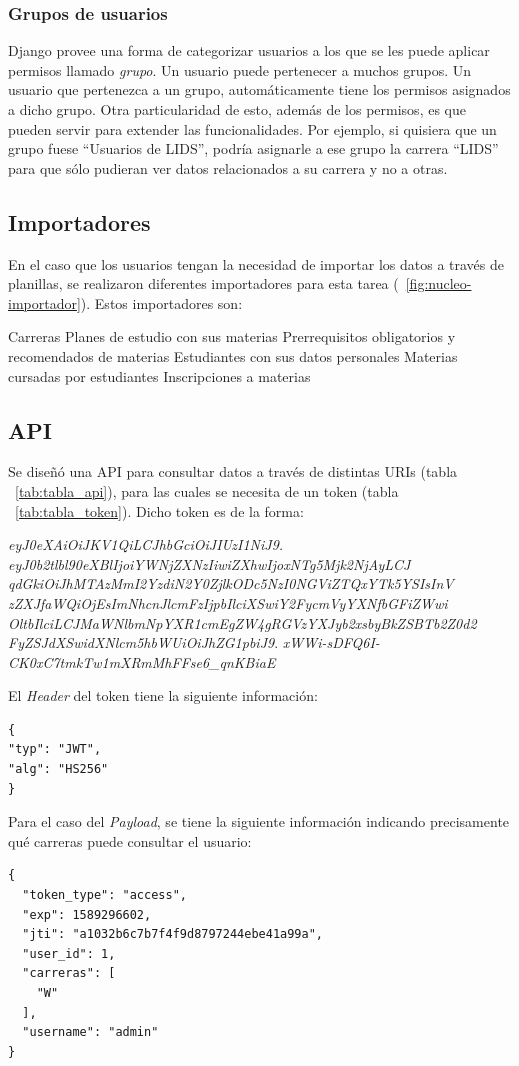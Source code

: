 \subsubsection{Grupos de usuarios}

Django provee una forma de categorizar usuarios a los que se les puede aplicar permisos llamado \textit{grupo}. Un usuario puede pertenecer a muchos grupos.
Un usuario que pertenezca a un grupo, automáticamente tiene los permisos asignados a dicho grupo.
Otra particularidad de esto, además de los permisos, es que pueden servir para extender las funcionalidades. Por ejemplo, si quisiera que un grupo fuese “Usuarios de LIDS”, podría asignarle a ese grupo la carrera “LIDS” para que sólo pudieran ver datos relacionados a su carrera y no a otras.


\subsection{Importadores}

En el caso que los usuarios tengan la necesidad de importar los datos a través de planillas, se realizaron diferentes importadores para esta tarea (~\ref{fig:nucleo-importador}).
Estos importadores son:
\begin{outline}
\2 Carreras
\2 Planes de estudio con sus materias
\2 Prerrequisitos obligatorios y recomendados de materias
\2 Estudiantes con sus datos personales
\2 Materias cursadas por estudiantes
\2 Inscripciones a materias
\end{outline}

\subsection{API}

Se diseñó una API para consultar datos a través de distintas URIs (tabla ~\ref{tab:tabla_api}), para las cuales se necesita de un token (tabla ~\ref{tab:tabla_token}).
Dicho token es de la forma:

\textit{eyJ0eXAiOiJKV1QiLCJhbGciOiJIUzI1NiJ9.} \break 
\textit{eyJ0b2tlbl90eXBlIjoiYWNjZXNzIiwiZXhwIjoxNTg5Mjk2NjAyLCJ}\break 
\textit{qdGkiOiJhMTAzMmI2YzdiN2Y0ZjlkODc5NzI0NGViZTQxYTk5YSIsInV}\break 
\textit{zZXJfaWQiOjEsImNhcnJlcmFzIjpbIlciXSwiY2FycmVyYXNfbGFiZWwi} \break \textit{OltbIlciLCJMaWNlbmNpYXR1cmEgZW4gRGVzYXJyb2xsbyBkZSBTb2Z0d2}\break 
\textit{FyZSJdXSwidXNlcm5hbWUiOiJhZG1pbiJ9}.\break 
\textit{xWWi-sDFQ6I-CK0xC7tmkTw1mXRmMhFFse6\_qnKBiaE}

\break
El \textit{Header} del token tiene la siguiente información:
\begin{verbatim}
{
"typ": "JWT",
"alg": "HS256"
}
\end{verbatim}
\break
Para el caso del \textit{Payload}, se tiene la siguiente información indicando precisamente qué carreras puede consultar el usuario:
\begin{verbatim}
{
  "token_type": "access",
  "exp": 1589296602,
  "jti": "a1032b6c7b7f4f9d8797244ebe41a99a",
  "user_id": 1,
  "carreras": [
    "W"
  ],
  "username": "admin"
}
\end{verbatim}

